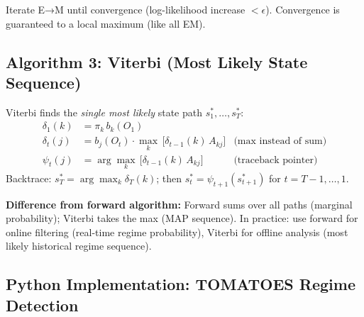 \documentclass[12pt,a4paper,openany]{report}
\theoremstyle{definition}
\begin{document}
Iterate E→M until convergence (log-likelihood increase $< \epsilon$). Convergence is guaranteed to a local maximum (like all EM).

\subsection{Algorithm 3: Viterbi (Most Likely State Sequence)}

Viterbi finds the \emph{single most likely} state path $s_1^*, \ldots, s_T^*$:
\begin{align}
  \delta_1(k) &= \pi_k\, b_k(O_1) \\
  \delta_t(j) &= b_j(O_t) \cdot \max_k\, \bigl[\delta_{t-1}(k)\, A_{kj}\bigr] & \text{(max instead of sum)} \\
  \psi_t(j) &= \arg\max_k\, \bigl[\delta_{t-1}(k)\, A_{kj}\bigr] & \text{(traceback pointer)}
\end{align}
Backtrace: $s_T^* = \arg\max_k \delta_T(k)$; then $s_t^* = \psi_{t+1}(s_{t+1}^*)$ for $t = T-1, \ldots, 1$.

\textbf{Difference from forward algorithm:} Forward sums over all paths (marginal probability); Viterbi takes the max (MAP sequence). In practice: use forward for online filtering (real-time regime probability), Viterbi for offline analysis (most likely historical regime sequence).

\subsection{Python Implementation: TOMATOES Regime Detection}
\end{document}
